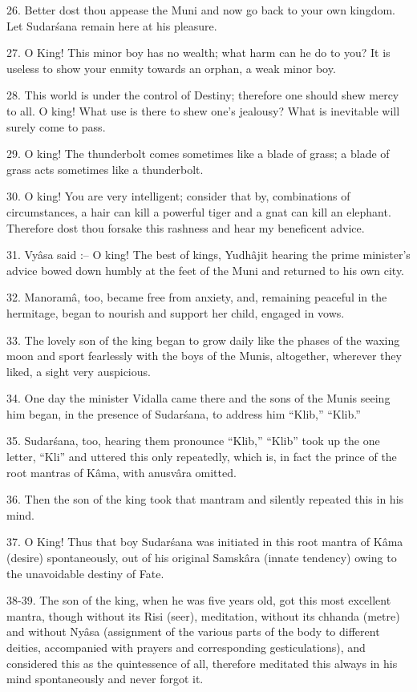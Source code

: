 26. Better dost thou appease the Muni and now go back to your own kingdom. Let Sudar\'sana remain here at his pleasure.

27. O King! This minor boy has no wealth; what harm can he do to you? It is useless to show your enmity towards an orphan, a weak minor boy.

28. This world is under the control of Destiny; therefore one should shew mercy to all. O king! What use is there to shew one's jealousy? What is inevitable will surely come to pass.

29. O king! The thunderbolt comes sometimes like a blade of grass; a blade of grass acts sometimes like a thunderbolt.

30. O king! You are very intelligent; consider that by, combinations of circumstances, a hair can kill a powerful tiger and a gnat can kill an elephant. Therefore dost thou forsake this rashness and hear my beneficent advice.

31. Vy\^asa said :-- O king! The best of kings, Yudh\^ajit hearing the prime minister's advice bowed down humbly at the feet of the Muni and returned to his own city.

32. Manoram\^a, too, became free from anxiety, and, remaining peaceful in the hermitage, began to nourish and support her child, engaged in vows.

33. The lovely son of the king began to grow daily like the phases of the waxing moon and sport fearlessly with the boys of the Munis, altogether, wherever they liked, a sight very auspicious.

34. One day the minister Vidalla came there and the sons of the Munis seeing him began, in the presence of Sudar\'sana, to address him ``Klib,'' ``Klib.''

35. Sudar\'sana, too, hearing them pronounce ``Klib,'' ``Klib'' took up the one letter, ``Kli'' and uttered this only repeatedly, which is, in fact the prince of the root mantras of K\^ama, with anusv\^ara omitted.

36. Then the son of the king took that mantram and silently repeated this in his mind.

37. O King! Thus that boy Sudar\'sana was initiated in this root mantra of K\^ama (desire) spontaneously, out of his original Samsk\^ara (innate tendency) owing to the unavoidable destiny of Fate.

38-39. The son of the king, when he was five years old, got this most excellent mantra, though without its Risi (seer), meditation, without its chhanda (metre) and without Ny\^asa (assignment of the various parts of the body to different deities, accompanied with prayers and corresponding gesticulations), and considered this as the quintessence of all, therefore meditated this always in his mind spontaneously and never forgot it.

